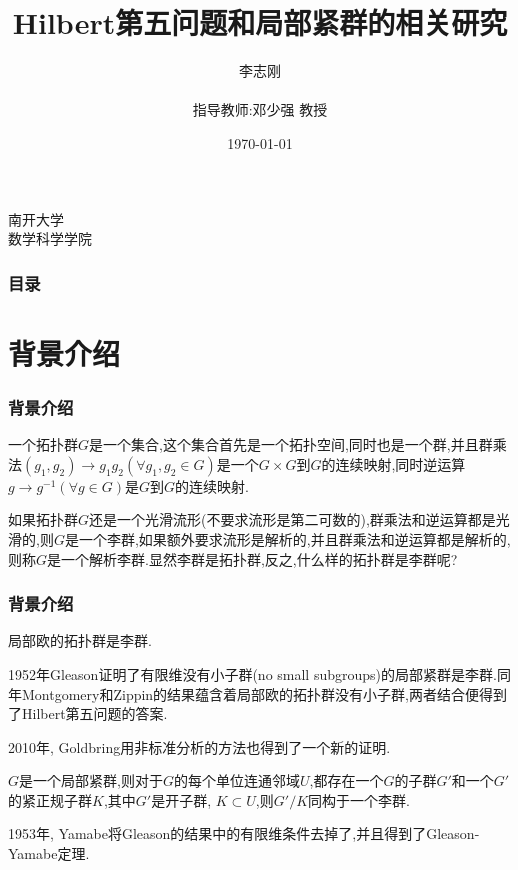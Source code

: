 \documentclass[aspectratio=169, 10pt, utf8, mathserif]{beamer}
\begin{document}

\title{Hilbert第五问题和局部紧群的相关研究}

\author{李志刚 \\ \quad \\ 指导教师:邓少强 教授}
\institute
{
	南开大学 \\
	数学科学学院
}
\date{\today}
\begin{frame}
    \titlepage
\end{frame}

\begin{frame}
	\frametitle{目录}
	\tableofcontents[hideallsubsections]
\end{frame}

\section{背景介绍}

\begin{frame}[plain]
	\frametitle{背景介绍}
	\begin{Definition}
		一个拓扑群$G$是一个集合,这个集合首先是一个拓扑空间,同时也是一个群,并且群乘法$(g_1,g_2)\to g_1g_2(\forall g_1,g_2\in G)$是一个$G \times G$到$G$的连续映射,同时逆运算$g\to g^{-1}(\forall g\in G)$是$G$到$G$的连续映射.
	\end{Definition}

	如果拓扑群$G$还是一个光滑流形(不要求流形是第二可数的),群乘法和逆运算都是光滑的,则$G$是一个李群,如果额外要求流形是解析的,并且群乘法和逆运算都是解析的,则称$G$是一个解析李群.显然李群是拓扑群,反之,什么样的拓扑群是李群呢?
\end{frame}

\begin{frame}[plain]
	\frametitle{背景介绍}

	\begin{Theorem}[Hilbert第五问题]
		局部欧的拓扑群是李群.
	\end{Theorem}
	1952年Gleason证明了有限维没有小子群(no small subgroups)的局部紧群是李群.同年Montgomery和Zippin的结果蕴含着局部欧的拓扑群没有小子群,两者结合便得到了Hilbert第五问题的答案. 
	
	2010年, Goldbring用非标准分析的方法也得到了一个新的证明.
	\begin{Theorem}
		$G$是一个局部紧群,则对于$G$的每个单位连通邻域$U$,都存在一个$G$的子群$G'$和一个$G'$的紧正规子群$K$,其中$G'$是开子群, $K\subset U$,则$G'/K$同构于一个李群.
	\end{Theorem}
	1953年, Yamabe将Gleason的结果中的有限维条件去掉了,并且得到了Gleason-Yamabe定理.
\end{frame}
\end{document}
